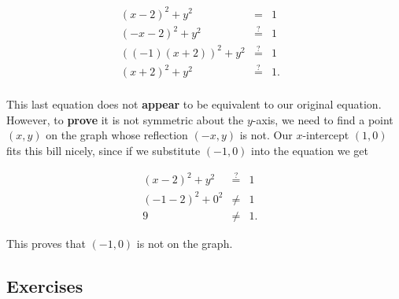 \[ \begin{array}{rclr}  

(x-2)^2 + y^2 & = & 1 & \\
(-x-2)^2 + y^2 & \stackrel{?}{=} & 1 & \\
((-1)(x+2))^2 + y^2 & \stackrel{?}{=} & 1 & \\
(x+2)^2 + y^2 & \stackrel{?}{=} & 1. & \\

\end{array} \]

This last equation does not \textbf{appear} to be equivalent to our original equation.  However, to \textbf{prove} it is not symmetric about the $y$-axis, we need to find a point $(x,y)$ on the graph whose reflection $(-x,y)$ is not. Our $x$-intercept $(1,0)$ fits this bill nicely, since if we substitute $(-1,0)$ into the equation we get

\[ \begin{array}{rclr}   

(x-2)^2+y^2 & \stackrel{?}{=} & 1 & \\
(-1-2)^2 + 0^2 & \neq & 1 & \\
9 & \neq & 1. & 

\end{array} \]

This proves that $(-1,0)$ is not on the graph.

\newpage

\subsection{Exercises}

